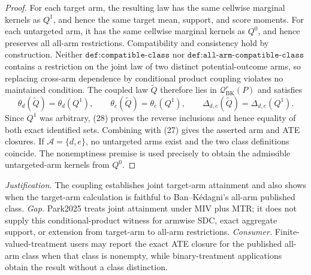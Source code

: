 \documentclass{article}
\begin{document}
\begin{proof}
For each target arm, the resulting law has the same cellwise marginal kernels as \(Q^1\), and hence the same target mean, support, and score moments.  For each untargeted arm, it has the same cellwise marginal kernels as \(Q^0\), and hence preserves all all-arm restrictions.  Compatibility and consistency hold by construction.  Neither \(\texttt{def:compatible-class}\) nor \(\texttt{def:all-arm-compatible-class}\) contains a restriction on the joint law of two distinct potential-outcome arms, so replacing cross-arm dependence by conditional product coupling violates no maintained condition.  The coupled law \(\widetilde Q\) therefore lies in \(\mathcal Q_{\mathrm{BK}}^r(P)\) and satisfies
\[
 \theta_d(\widetilde Q)=\theta_d(Q^1),\qquad
 \theta_e(\widetilde Q)=\theta_e(Q^1),\qquad
 \Delta_{d,e}(\widetilde Q)=\Delta_{d,e}(Q^1).                               \tag{28}
\]
Since \(Q^1\) was arbitrary, (28) proves the reverse inclusions and hence equality of both exact identified sets.  Combining with (27) gives the asserted arm and ATE closures.  If \(\mathcal A=\{d,e\}\), no untargeted arms exist and the two class definitions coincide.  The nonemptiness premise is used precisely to obtain the admissible untargeted-arm kernels from \(Q^0\).
\end{proof}
\par\smallskip\noindent \textit{Justification.} The coupling establishes joint target-arm attainment and also shows when the target-arm calculation is faithful to Ban--Kédagni's all-arm published class. \textit{Gap.} Park2025 treats joint attainment under MIV plus MTR; it does not supply this conditional-product witness for armwise SDC, exact aggregate support, or extension from target-arm to all-arm restrictions. \textit{Consumer.} Finite-valued-treatment users may report the exact ATE closure for the published all-arm class when that class is nonempty, while binary-treatment applications obtain the result without a class distinction.
\end{document}
